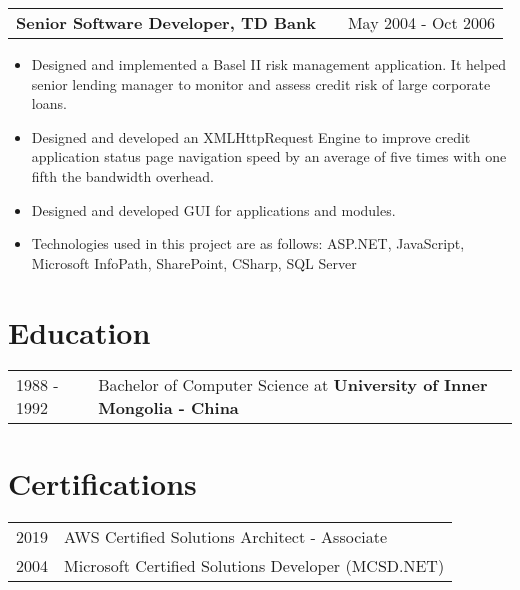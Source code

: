 \documentclass[a4paper,12pt]{article}
\makeatletter
\newenvironment{joblong}[2]
    {
    \begin{tabularx}{\linewidth}{@{}l X r@{}}
    \textbf{#1} & \hfill &  #2 \\[3.75pt]
    \end{tabularx}
    \begin{minipage}[t]{\linewidth}
    \begin{itemize}[nosep,after=\strut, leftmargin=1em, itemsep=3pt,label=--]
    }
    {
    \end{itemize}
    \end{minipage}    
    }
\makeatother
\begin{document}
\begin{joblong}{Senior Software Developer, TD Bank}{May 2004 - Oct 2006}
\item Designed and implemented a Basel II risk management application. It helped senior lending manager to monitor and assess credit risk of large corporate loans.
\item Designed and developed an XMLHttpRequest Engine to improve credit application status page navigation speed by an average of five times with one fifth the bandwidth overhead. 
\item Designed and developed GUI for applications and modules.
\item Technologies used in this project are as follows:  ASP.NET, JavaScript, Microsoft InfoPath, SharePoint, CSharp, SQL Server
\end{joblong}

\section{Education}
\begin{tabularx}{\linewidth}{@{}l X@{}}	
1988 - 1992 & Bachelor of Computer Science at \textbf{University of Inner Mongolia - China} 
\end{tabularx}

\section{Certifications}
\begin{tabularx}{\linewidth}{@{}l X@{}}
2019 & AWS Certified Solutions Architect - Associate\\
2004 & Microsoft Certified Solutions Developer (MCSD.NET) 
\end{tabularx}


\vfill
{}
\end{document}
